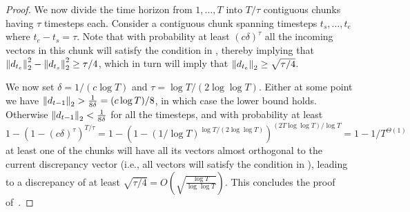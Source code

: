 \begin{proof}
    We now divide the time horizon from $1,\ldots, T$ into $T/\tau$ contiguous chunks having $\tau$ timesteps each. Consider a contiguous chunk spanning timesteps $t_s, \ldots, t_e$ where $t_e - t_s = \tau$. Note that with probability at least $(c\delta)^\tau$ all the incoming vectors in this chunk will satisfy the condition in , thereby implying that $\left\lVert d_{t_e}\right\rVert_2^2 - \left\lVert d_{t_s}\right\rVert_2^2 \geq \tau/4$, which in turn will imply that $\left\lVert d_{t_e}\right\rVert_2 \geq \sqrt{\tau/4}$.
    
    We now set $\delta = 1/(c \log{T})$ and $\tau = \log{T}/(2\log{\log{T}})$. Either at some point we have $\left\lVert d_{t-1}\right\rVert_2 > \frac{1}{8 \delta} = (c\log{T})/8$, in which case the lower bound holds. Otherwise $\left\lVert d_{t-1}\right\rVert_2 < \frac{1}{8 \delta}$ for all the timesteps, and with probability at least $1- \left(1 - (c\delta)^\tau\right)^{T/\tau} = 1- \left(1 - (1/\log{T})^{\log{T}/(2\log{\log{T}})}\right)^{(2T\log{\log{T}})/\log{T}} = 1- 1/T^{\Theta(1)}$ at least one of the chunks will have all its vectors almost orthogonal to the current discrepancy vector (i.e., all vectors will satisfy the condition in ), leading to a discrepancy of at least $\sqrt{\tau/4} = O\left(\sqrt{\frac{\log{T}}{\log{\log{T}}}}\right)$. This concludes the proof of~.
\end{proof}





